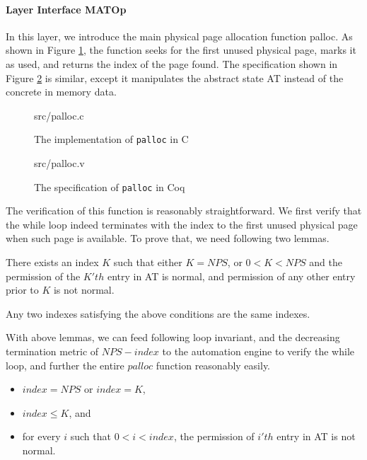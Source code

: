 \paragraph{Layer Interface MATOp}

In this layer, we introduce the main physical page allocation function \textsf{palloc}.
As shown in Figure \ref{fig:palloc_c}, the function seeks for the first unused physical page,
marks it as used, and returns the index of the page found.
The specification shown in Figure \ref{fig:palloc_v} is similar, except it manipulates
the abstract state \textsf{AT} instead of the concrete in memory data.

\begin{figure}
	 {src/palloc.c}
	\caption{The implementation of \texttt{palloc} in C}
	\label{fig:palloc_c}
\end{figure}

\begin{figure}
	 {src/palloc.v}
	\caption{The specification of \texttt{palloc} in Coq}
	\label{fig:palloc_v}
\end{figure}

The verification of this function is reasonably straightforward. We first verify that
the while loop indeed terminates with the index to the first unused physical page when such page is available.
To prove that, we need following two lemmas.

\begin{lemma}[Termination] There exists an index $K$ such that either $K=NPS$, or $0<K<NPS$ and the permission of the $K'th$ entry
in AT is normal, and permission of any other entry prior to $K$ is not normal.
\end{lemma}

\begin{lemma} [Unique] Any two indexes satisfying the above conditions are the same indexes.
\end{lemma}

With above lemmas, we can feed following loop invariant, and the decreasing termination metric of $NPS-index$ to 
the automation engine to verify the while loop, and further the entire $palloc$ function reasonably easily.

\begin{definition} 
\begin{itemize}
\item $index=NPS$ or $index=K$,
\item $index\le K$, and
\item for every $i$ such that $0<i<index$, the permission of $i'th$ entry in AT is not normal.
\end{itemize}
\end{definition}



